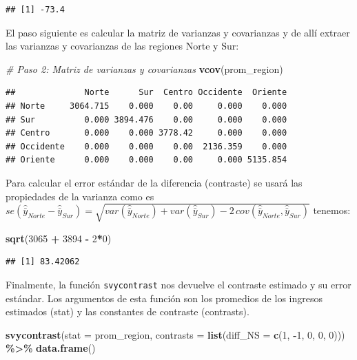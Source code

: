 \documentclass[
  12pt,
]{book}
\newenvironment{Shaded}{\begin{snugshade}}{\end{snugshade}}
\newcommand{\AttributeTok}[1]{\textcolor[rgb]{0.13,0.29,0.53}{#1}}
\newcommand{\CommentTok}[1]{\textcolor[rgb]{0.56,0.35,0.01}{\textit{#1}}}
\newcommand{\DecValTok}[1]{\textcolor[rgb]{0.00,0.00,0.81}{#1}}
\newcommand{\FunctionTok}[1]{\textcolor[rgb]{0.13,0.29,0.53}{\textbf{#1}}}
\newcommand{\NormalTok}[1]{#1}
\newcommand{\SpecialCharTok}[1]{\textcolor[rgb]{0.81,0.36,0.00}{\textbf{#1}}}
\begin{document}
\begin{verbatim}
## [1] -73.4
\end{verbatim}

El paso siguiente es calcular la matriz de varianzas y covarianzas y de allí extraer las varianzas y covarianzas de las regiones Norte y Sur:

\begin{Shaded}
\begin{Highlighting}[]
\CommentTok{\# Paso 2: Matriz de varianzas y covarianzas}
\FunctionTok{vcov}\NormalTok{(prom\_region)}
\end{Highlighting}
\end{Shaded}

\begin{verbatim}
##              Norte      Sur  Centro Occidente  Oriente
## Norte     3064.715    0.000    0.00     0.000    0.000
## Sur          0.000 3894.476    0.00     0.000    0.000
## Centro       0.000    0.000 3778.42     0.000    0.000
## Occidente    0.000    0.000    0.00  2136.359    0.000
## Oriente      0.000    0.000    0.00     0.000 5135.854
\end{verbatim}

Para calcular el error estándar de la diferencia (contraste) se usará las propiedades de la varianza como es
\(se\left(\hat{\bar{y}}_{Norte}-\hat{\bar{y}}_{Sur}\right)=\sqrt{var\left(\hat{\bar{y}}_{Norte}\right)+var\left(\hat{\bar{y}}_{Sur}\right)-2\,cov\left(\hat{\bar{y}}_{Norte},\hat{\bar{y}}_{Sur}\right)}\) tenemos:

\begin{Shaded}
\begin{Highlighting}[]
\FunctionTok{sqrt}\NormalTok{(}\DecValTok{3065} \SpecialCharTok{+} \DecValTok{3894} \SpecialCharTok{{-}} \DecValTok{2}\SpecialCharTok{*}\DecValTok{0}\NormalTok{)}
\end{Highlighting}
\end{Shaded}

\begin{verbatim}
## [1] 83.42062
\end{verbatim}

Finalmente, la función \texttt{svycontrast} nos devuelve el contraste estimado y su error estándar. Los argumentos de esta función son los promedios de los ingresos estimados (stat) y las constantes de contraste (contrasts).

\begin{Shaded}
\begin{Highlighting}[]
\FunctionTok{svycontrast}\NormalTok{(}\AttributeTok{stat =}\NormalTok{ prom\_region,}
            \AttributeTok{contrasts =} \FunctionTok{list}\NormalTok{(}\AttributeTok{diff\_NS =} \FunctionTok{c}\NormalTok{(}\DecValTok{1}\NormalTok{, }\SpecialCharTok{{-}}\DecValTok{1}\NormalTok{, }\DecValTok{0}\NormalTok{, }\DecValTok{0}\NormalTok{, }\DecValTok{0}\NormalTok{))) }\SpecialCharTok{\%\textgreater{}\%}
            \FunctionTok{data.frame}\NormalTok{()}
\end{Highlighting}
\end{Shaded}
\end{document}
